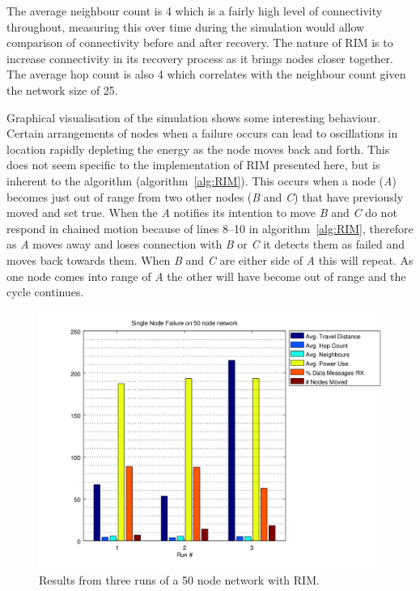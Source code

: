 \documentclass[authoryearcitations]{UoYCSproject}
\begin{document}
The average neighbour count is 4 which is a fairly high level of connectivity throughout, measuring this over time during the simulation would allow comparison of connectivity before and after recovery. The nature of RIM is to increase connectivity in its recovery process as it brings nodes closer together. The average hop count is also 4 which correlates with the neighbour count given the network size of 25.

Graphical visualisation of the simulation shows some interesting behaviour. Certain arrangements of nodes when a failure occurs can lead to oscillations in location rapidly depleting the energy as the node moves back and forth. This does not seem specific to the implementation of RIM presented here, but is inherent to the algorithm (algorithm~\ref{alg:RIM}). This occurs when a node (\emph{A}) becomes just out of range from two other nodes (\emph{B} and \emph{C}) that have previously moved and set  true. When the \emph{A} notifies its intention to move \emph{B} and \emph{C} do not respond in chained motion because of lines 8--10 in algorithm~\ref{alg:RIM}, therefore as \emph{A} moves away and loses connection with \emph{B} or \emph{C} it detects them as failed and moves back towards them. When \emph{B} and \emph{C} are either side of \emph{A} this will repeat. As one node comes into range of \emph{A} the other will have become out of range and the cycle continues.

\begin{figure}
 \centering
    \includegraphics[width=\textwidth]{figures/singlefail_50node.png}
    \caption{Results from three runs of a 50 node network with RIM.}
    \label{fig:singlefail_50node}
\end{figure}
\end{document}
